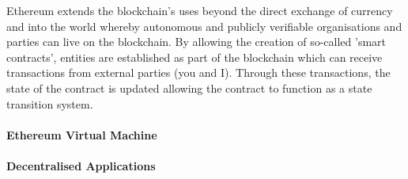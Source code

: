 Ethereum extends the blockchain's uses beyond the direct exchange of currency and into the world whereby autonomous and publicly verifiable organisations and parties can live on the blockchain. By allowing the creation of so-called 'smart contracts', entities are established as part of the blockchain which can receive transactions from external parties (you and I). Through these transactions, the state of the contract is updated allowing the contract to function as a state transition system.

\paragraph{Ethereum Virtual Machine}



\paragraph{Decentralised Applications}





